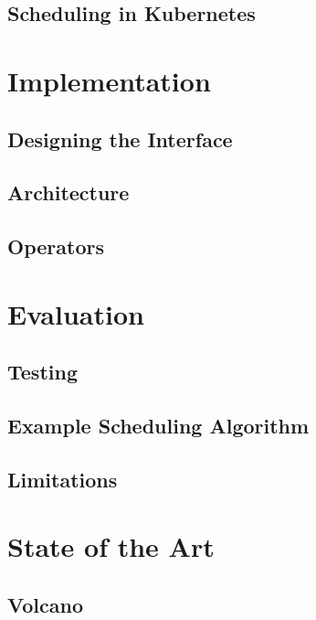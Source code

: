 \section{Scheduling in Kubernetes}



\chapter{Implementation}
\section{Designing the Interface}

\section{Architecture}

\section{Operators}


\chapter{Evaluation}
\section{Testing}

\section{Example Scheduling Algorithm} \label{sec:exampleSchedulingAlgorithm}

\section{Limitations}


\chapter{State of the Art}
\section{Volcano}

